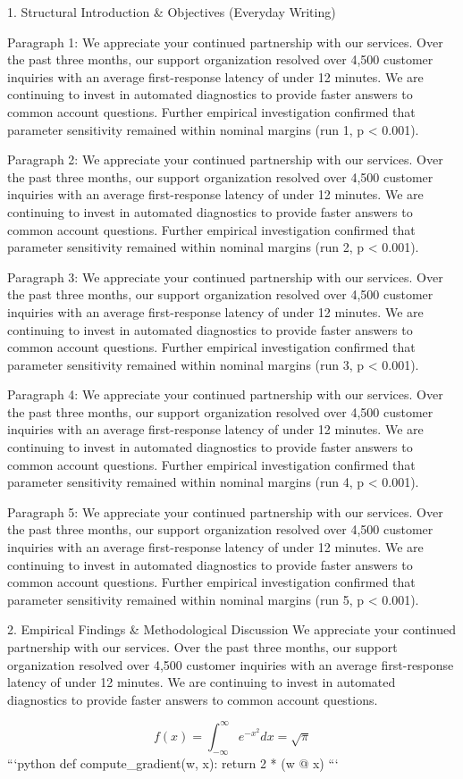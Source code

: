 1. Structural Introduction & Objectives (Everyday Writing)


Paragraph 1: We appreciate your continued partnership with our services. Over the past three months, our support organization resolved over 4,500 customer inquiries with an average first-response latency of under 12 minutes. We are continuing to invest in automated diagnostics to provide faster answers to common account questions. Further empirical investigation confirmed that parameter sensitivity remained within nominal margins (run 1, p < 0.001).

Paragraph 2: We appreciate your continued partnership with our services. Over the past three months, our support organization resolved over 4,500 customer inquiries with an average first-response latency of under 12 minutes. We are continuing to invest in automated diagnostics to provide faster answers to common account questions. Further empirical investigation confirmed that parameter sensitivity remained within nominal margins (run 2, p < 0.001).

Paragraph 3: We appreciate your continued partnership with our services. Over the past three months, our support organization resolved over 4,500 customer inquiries with an average first-response latency of under 12 minutes. We are continuing to invest in automated diagnostics to provide faster answers to common account questions. Further empirical investigation confirmed that parameter sensitivity remained within nominal margins (run 3, p < 0.001).

Paragraph 4: We appreciate your continued partnership with our services. Over the past three months, our support organization resolved over 4,500 customer inquiries with an average first-response latency of under 12 minutes. We are continuing to invest in automated diagnostics to provide faster answers to common account questions. Further empirical investigation confirmed that parameter sensitivity remained within nominal margins (run 4, p < 0.001).

Paragraph 5: We appreciate your continued partnership with our services. Over the past three months, our support organization resolved over 4,500 customer inquiries with an average first-response latency of under 12 minutes. We are continuing to invest in automated diagnostics to provide faster answers to common account questions. Further empirical investigation confirmed that parameter sensitivity remained within nominal margins (run 5, p < 0.001).


2. Empirical Findings & Methodological Discussion
We appreciate your continued partnership with our services. Over the past three months, our support organization resolved over 4,500 customer inquiries with an average first-response latency of under 12 minutes. We are continuing to invest in automated diagnostics to provide faster answers to common account questions.

$$ f(x) = \int_{-\infty}^{\infty} e^{-x^2} dx = \sqrt{\pi} $$ 
```python
def compute_gradient(w, x):
    return 2 * (w @ x)
```